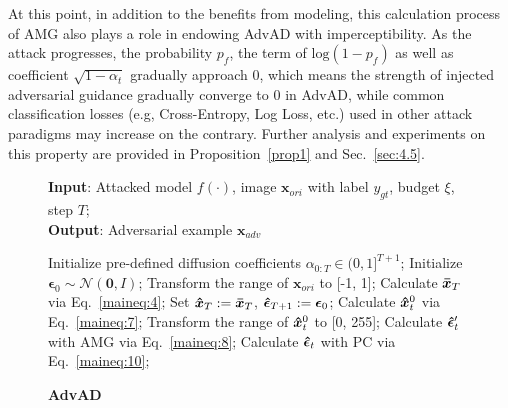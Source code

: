 \documentclass{article}
\begin{document}
At this point, in addition to the benefits from modeling, this calculation process of AMG also plays a role in endowing AdvAD with imperceptibility. As the attack progresses, the probability $p_f$, the term of $\text{log}(1-p_f)$ as well as coefficient $\sqrt{1-\alpha_t}$ gradually approach 0, which means the strength of injected adversarial guidance gradually converge to 0 in AdvAD, while common classification losses (e.g, Cross-Entropy, Log Loss, etc.) used in other attack paradigms may increase on the contrary. Further analysis and experiments on this property are provided in Proposition~\ref{prop1} and Sec.~\ref{sec:4.5}.

\begin{figure}[t]
\centering
\begin{minipage}{0.9\linewidth}
\begin{algorithm}[H]
    \footnotesize
    \caption{\textbf{AdvAD}}
    \label{alg:algorithm}
    \textbf{Input}: Attacked model $f(\cdot)$, image $\boldsymbol{x}_{ori}$ with label $y_{gt}$, budget $\xi$, step $T$;\\
    \textbf{Output}: Adversarial example $\boldsymbol{x}_{adv}$
    \begin{algorithmic}[1] %
        \STATE Initialize pre-defined diffusion coefficients $\alpha_{0:T}\in(0,1]^{T+1}$;
        \STATE Initialize $\boldsymbol{\epsilon}_{0} \sim \mathcal{N}(\boldsymbol{0}, \boldsymbol{\mathit{I}})$; 
        \STATE Transform the range of $\boldsymbol{x}_{ori}$ to [-1, 1]; 
        \STATE Calculate $\boldsymbol{\Bar{x}}_{T}$ via Eq.~\eqref{maineq:4}; 
        \STATE Set $\boldsymbol{\Hat{x}}_{T}:=\boldsymbol{\Bar{x}}_{T}$, $\boldsymbol{\Hat{\epsilon}}_{T+1}:=\boldsymbol{\epsilon}_{0}$; 
            \STATE Calculate $\boldsymbol{\Hat{x}}_{t}^{0}$ via Eq.~\eqref{maineq:7}; 
            \STATE Transform the range of $\boldsymbol{\Hat{x}}_t^0$ to [0, 255]; 
                \STATE Calculate $\boldsymbol{\Hat{\epsilon}}_{t}'$ with AMG via Eq.~\eqref{maineq:8}; 
                \STATE Calculate $\boldsymbol{\Hat{\epsilon}}_{t}$ with PC  via Eq.~\eqref{maineq:10}; 

\end{algorithmic}
\end{algorithm}
\end{minipage}
\end{figure}
\end{document}
